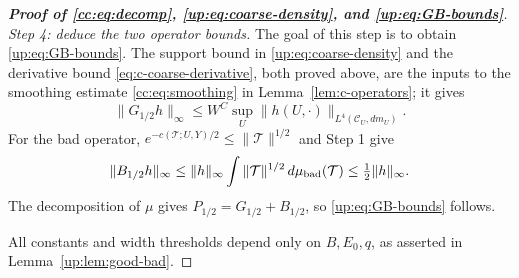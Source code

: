 \documentclass[11pt]{article}
\numberwithin{equation}{section}
\theoremstyle{remark}
\begin{document}
\begin{proof}[\textbf{Proof of \eqref{cc:eq:decomp}, \eqref{up:eq:coarse-density}, and \eqref{up:eq:GB-bounds}}]
\medskip\noindent\emph{Step 4: deduce the two operator bounds.}
The goal of this step is to obtain \eqref{up:eq:GB-bounds}.
The support bound in \eqref{up:eq:coarse-density} and the derivative
bound \eqref{eq:c-coarse-derivative}, both proved above, are the
inputs to the smoothing estimate \eqref{cc:eq:smoothing} in
Lemma~\ref{lem:c-operators}; it gives
\[
 \|G_{1/2}h\|_\infty
 \le W^C\sup_U\|h(U,\cdot)\|_{L^4(\mathcal C_U,dm_U)}.
\]
For the bad operator, $e^{-c(\mathcal T;U,Y)/2}\le\|\mathcal T\|^{1/2}$ and Step 1 give
\[
 \|B_{1/2}h\|_\infty
 \le\|h\|_\infty\int\|\mathcal T\|^{1/2}\,d\mu_{\rm bad}(\mathcal T)
 \le\tfrac12\|h\|_\infty.
\]
The decomposition of $\mu$ gives $P_{1/2}=G_{1/2}+B_{1/2}$, so
\eqref{up:eq:GB-bounds} follows.

All constants and width thresholds depend only on $B,E_0,q$,
as asserted in Lemma~\ref{up:lem:good-bad}.
\end{proof}
\end{document}

